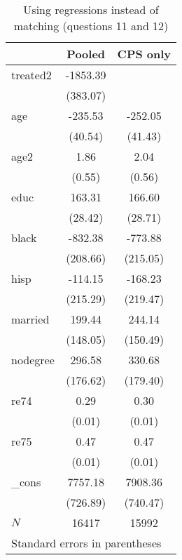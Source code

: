 \begin{table}[htbp]\centering
\caption{Using regressions instead of matching (questions 11 and 12)\label{q12}}
\begin{tabular}{l*{2}{c}}
\toprule
            &\multicolumn{1}{c}{Pooled}&\multicolumn{1}{c}{CPS only}\\
\midrule
treated2    &    -1853.39&            \\
            &    (383.07)&            \\
\addlinespace
age         &     -235.53&     -252.05\\
            &     (40.54)&     (41.43)\\
\addlinespace
age2        &        1.86&        2.04\\
            &      (0.55)&      (0.56)\\
\addlinespace
educ        &      163.31&      166.60\\
            &     (28.42)&     (28.71)\\
\addlinespace
black       &     -832.38&     -773.88\\
            &    (208.66)&    (215.05)\\
\addlinespace
hisp        &     -114.15&     -168.23\\
            &    (215.29)&    (219.47)\\
\addlinespace
married     &      199.44&      244.14\\
            &    (148.05)&    (150.49)\\
\addlinespace
nodegree    &      296.58&      330.68\\
            &    (176.62)&    (179.40)\\
\addlinespace
re74        &        0.29&        0.30\\
            &      (0.01)&      (0.01)\\
\addlinespace
re75        &        0.47&        0.47\\
            &      (0.01)&      (0.01)\\
\addlinespace
\_cons      &     7757.18&     7908.36\\
            &    (726.89)&    (740.47)\\
\midrule
\(N\)       &       16417&       15992\\
\bottomrule
\multicolumn{3}{l}{\footnotesize Standard errors in parentheses}\\
\end{tabular}
\end{table}
